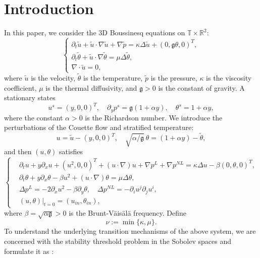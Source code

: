 \documentclass[12pt]{article}
\numberwithin{equation}{section}
\begin{document}
	\section{Introduction}
		In this paper, we consider the 3D Boussinesq equations on $\mathbb{T}\times\mathbb{R}^2$:
	\begin{equation*}
		\left\{\begin{array}{l}
			\partial_t \tilde{u}+\tilde{u} \cdot \nabla \tilde{u}+\nabla \tilde{p}=\kappa \Delta \tilde{u}+(0,\mathfrak{g}\theta,0)^T, \\
			\partial_t \tilde{\theta}+\tilde{u} \cdot \nabla \tilde{\theta}=\mu \Delta \tilde{\theta}, \\
			\nabla \cdot \tilde{u}=0 ,
		\end{array}\right.
	\end{equation*}
	where $\tilde{u}$ is the velocity, $\tilde{\theta}$ is the temperature, $\tilde{p}$ is the pressure, $\kappa$ is the viscosity coefficient, $\mu$ is the thermal diffusivity, and  $\mathfrak{g}>0$ is the constant of gravity. A stationary states
	\begin{equation*}
		u^s=(y,0,0)^T,\quad\partial_yp^s=\mathfrak{g}(1+\alpha y),\quad\theta^s=1+\alpha y,
	\end{equation*}
	where the constant $\alpha>0$ is the Richardson number.
	We introduce the perturbations of the Couette flow and stratified temperature:
	\begin{equation*}
		u=\tilde{u}-(y,0,0)^{T},\quad\sqrt{\alpha/\mathfrak{g}}\ \theta=(1+\alpha y)-\tilde{\theta},
	\end{equation*}
	and then $(u,\theta)$ satisfies
	\begin{equation}\label{eq-main}
		\left\{
		\begin{aligned}
			&\partial_t u+y\partial_x u+(u^2,0,0)^T+(u\cdot\nabla)u+\nabla p^L+\nabla p^{NL}=\kappa \Delta u-\beta(0,\theta,0)^T,\\
			&\partial_t \theta+y\partial_x \theta-\beta u^2+(u\cdot\nabla)\theta=\mu\Delta\theta,\\
			&\Delta p^L=-2\partial_x u^2-\beta\partial_y \theta,\quad\Delta p^{NL}=-\partial_i u^j\partial_j u^i,\\
			&(u,\theta)|_{t=0}=(u_{in},\theta_{in}),
		\end{aligned}
		\right.
	\end{equation}
	where $\beta=\sqrt{\alpha\mathfrak{g}}>0$ is the Brunt-V\"ais\"al\"a frequency. 
    Define
    \begin{equation*}
        \nu:=\min\{\kappa,\mu\}.
    \end{equation*}To understand the underlying transition mechanisms of the above system, we are concerned with the stability threshold problem in the Sobolev spaces and formulate it as \cite{BGM17}:
	
\end{document}
